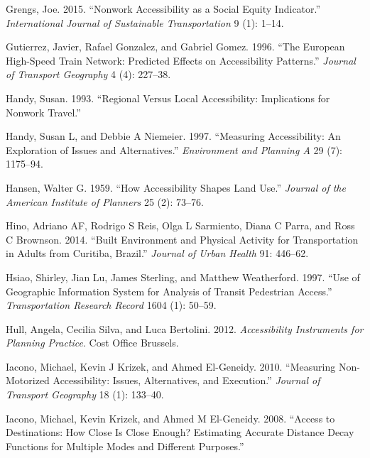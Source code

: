 \documentclass[preprint, 3p,
authoryear]{elsarticle} %
\newlength{\cslhangindent}
\newlength{\cslentryspacingunit} %
\newenvironment{CSLReferences}[2] %
 {%
  \setlength{\parindent}{0pt}
  \ifodd #1
  \let\oldpar\par
  \def\par{\hangindent=\cslhangindent\oldpar}
  \fi
  \setlength{\parskip}{#2\cslentryspacingunit}
 }%
 {}
\begin{document}
\begin{CSLReferences}{1}{0}
\leavevmode{}%
Grengs, Joe. 2015. {``Nonwork Accessibility as a Social Equity
Indicator.''} \emph{International Journal of Sustainable Transportation}
9 (1): 1--14.

\leavevmode{}%
Gutierrez, Javier, Rafael Gonzalez, and Gabriel Gomez. 1996. {``The
European High-Speed Train Network: Predicted Effects on Accessibility
Patterns.''} \emph{Journal of Transport Geography} 4 (4): 227--38.

\leavevmode{}%
Handy, Susan. 1993. {``Regional Versus Local Accessibility: Implications
for Nonwork Travel.''}

\leavevmode{}%
Handy, Susan L, and Debbie A Niemeier. 1997. {``Measuring Accessibility:
An Exploration of Issues and Alternatives.''} \emph{Environment and
Planning A} 29 (7): 1175--94.

\leavevmode{}%
Hansen, Walter G. 1959. {``How Accessibility Shapes Land Use.''}
\emph{Journal of the American Institute of Planners} 25 (2): 73--76.

\leavevmode{}%
Hino, Adriano AF, Rodrigo S Reis, Olga L Sarmiento, Diana C Parra, and
Ross C Brownson. 2014. {``Built Environment and Physical Activity for
Transportation in Adults from Curitiba, Brazil.''} \emph{Journal of
Urban Health} 91: 446--62.

\leavevmode{}%
Hsiao, Shirley, Jian Lu, James Sterling, and Matthew Weatherford. 1997.
{``Use of Geographic Information System for Analysis of Transit
Pedestrian Access.''} \emph{Transportation Research Record} 1604 (1):
50--59.

\leavevmode{}%
Hull, Angela, Cecilia Silva, and Luca Bertolini. 2012.
\emph{Accessibility Instruments for Planning Practice}. Cost Office
Brussels.

\leavevmode{}%
Iacono, Michael, Kevin J Krizek, and Ahmed El-Geneidy. 2010.
{``Measuring Non-Motorized Accessibility: Issues, Alternatives, and
Execution.''} \emph{Journal of Transport Geography} 18 (1): 133--40.

\leavevmode{}%
Iacono, Michael, Kevin Krizek, and Ahmed M El-Geneidy. 2008. {``Access
to Destinations: How Close Is Close Enough? Estimating Accurate Distance
Decay Functions for Multiple Modes and Different Purposes.''}


\end{CSLReferences}
\end{document}
